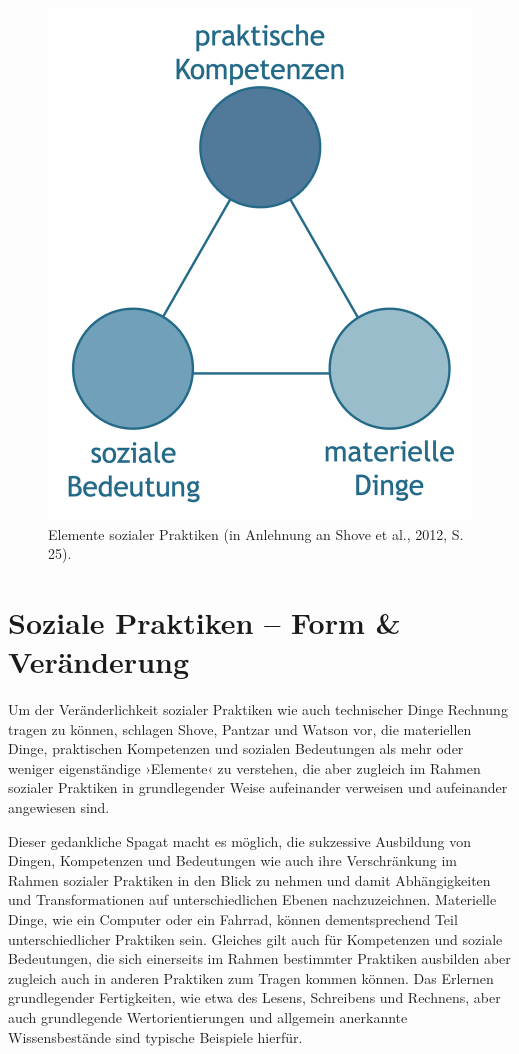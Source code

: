 \documentclass[
  a4paper,
]{book}
\begin{document}
\begin{figure}

{\centering \includegraphics[width=0.5\linewidth]{Figures/07-01-Elemente-sozialer-Praktiken} 

}

\caption{Elemente sozialer Praktiken (in Anlehnung an Shove et al., 2012, S. 25).}\label{fig:fig4}
\end{figure}

\section{Soziale Praktiken -- Form \& Veränderung}\label{soziale-praktiken-form-veruxe4nderung}

Um der Veränderlichkeit sozialer Praktiken wie auch technischer Dinge Rechnung tragen zu können, schlagen Shove, Pantzar und Watson vor, die materiellen Dinge, praktischen Kompetenzen und sozialen Bedeutungen als mehr oder weniger eigenständige ›Elemente‹ zu verstehen, die aber zugleich im Rahmen sozialer Praktiken in grundlegender Weise aufeinander verweisen und aufeinander angewiesen sind.

Dieser gedankliche Spagat macht es möglich, die sukzessive Ausbildung von Dingen, Kompetenzen und Bedeutungen wie auch ihre Verschränkung im Rahmen sozialer Praktiken in den Blick zu nehmen und damit Abhängigkeiten und Transformationen auf unterschiedlichen Ebenen nachzuzeichnen. Materielle Dinge, wie ein Computer oder ein Fahrrad, können dementsprechend Teil unterschiedlicher Praktiken sein. Gleiches gilt auch für Kompetenzen und soziale Bedeutungen, die sich einerseits im Rahmen bestimmter Praktiken ausbilden aber zugleich auch in anderen Praktiken zum Tragen kommen können. Das Erlernen grundlegender Fertigkeiten, wie etwa des Lesens, Schreibens und Rechnens, aber auch grundlegende Wertorientierungen und allgemein anerkannte Wissensbestände sind typische Beispiele hierfür.
\end{document}
